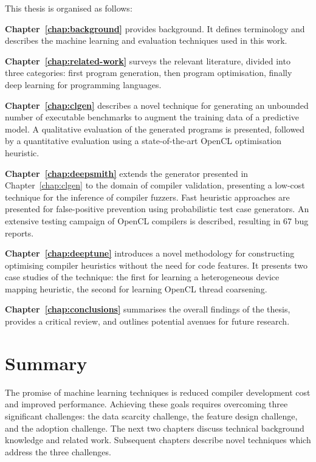 This thesis is organised as follows:

\textbf{Chapter~\ref{chap:background}} provides background. It defines terminology and describes the machine learning and evaluation techniques used in this work.

\textbf{Chapter~\ref{chap:related-work}} surveys the relevant literature, divided into three categories: first program generation, then program optimisation, finally deep learning for programming languages.

\textbf{Chapter~\ref{chap:clgen}} describes a novel technique for generating an unbounded number of executable benchmarks to augment the training data of a predictive model. A qualitative evaluation of the generated programs is presented, followed by a quantitative evaluation using a state-of-the-art OpenCL optimisation heuristic.

\textbf{Chapter~\ref{chap:deepsmith}} extends the generator presented in Chapter~\ref{chap:clgen} to the domain of compiler validation, presenting a low-cost technique for the inference of compiler fuzzers. Fast heuristic approaches are presented for false-positive prevention using probabilistic test case generators. An extensive testing campaign of OpenCL compilers is described, resulting in 67 bug reports.

\textbf{Chapter~\ref{chap:deeptune}} introduces a novel methodology for constructing optimising compiler heuristics without the need for code features. It presents two case studies of the technique: the first for learning a heterogeneous device mapping heuristic, the second for learning OpenCL thread coarsening.

\textbf{Chapter~\ref{chap:conclusions}} summarises the overall findings of the thesis, provides a critical review, and outlines potential avenues for future research.

\section{Summary}

The promise of machine learning techniques is reduced compiler development cost and improved performance. Achieving these goals requires overcoming three significant challenges: the data scarcity challenge, the feature design challenge, and the adoption challenge. The next two chapters discuss technical background knowledge and related work. Subsequent chapters describe novel techniques which address the three challenges.
